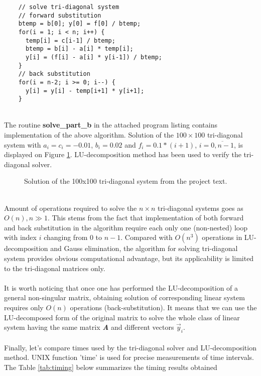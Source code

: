 \documentclass[]{article}
\begin{document}
  \begin{lstlisting}
    // solve tri-diagonal system
    // forward substitution
    btemp = b[0]; y[0] = f[0] / btemp;
    for(i = 1; i < n; i++) {
      temp[i] = c[i-1] / btemp;
      btemp = b[i] - a[i] * temp[i];
      y[i] = (f[i] - a[i] * y[i-1]) / btemp;
    }
    // back substitution
    for(i = n-2; i >= 0; i--) {
      y[i] = y[i] - temp[i+1] * y[i+1];
    }
  \end{lstlisting}
  \ \\
  The routine {\bf solve\_part\_b} in the attached program listing contains implementation of the above algorithm.
  Solution of the $100\times 100$ tri-diagonal system with $a_i = c_i = - 0.01$, $b_i = 0.02$ and $f_i = 0.1*(i+1)$,
  $i=\overline{0,n-1}$, is displayed on Figure \ref{fig:tridiag}. LU-decomposition method has been used to verify
  the tri-diagonal solver.\\
  \begin{figure}[htbp]
    \centering
    \caption{Solution of the 100x100 tri-diagonal system from the project text.}
    \label{fig:tridiag}
  \end{figure}
  \\
  Amount of operations required to solve the $n \times n$ tri-diagonal systems goes as $O(n), n \gg 1$. This stems
  from the fact that implementation of both forward and back substitution in the algorithm require each only
  one (non-nested) loop with index $i$ changing from 0 to $n-1$. Compared with $O(n^3)$ operations in LU-decomposition
  and Gauss elimination, the algorithm for solving tri-diagonal system provides obvious computational advantage,
  but its applicability is limited to the tri-diagonal matrices only.\\
  \\
  It is worth noticing that once one has performed the LU-decomposition of a general non-singular matrix, obtaining
  solution of corresponding linear system requires only $O(n)$ operations (back-substitution). It means that we
  can use the LU-decomposed form of the original matrix to solve the whole class of linear system having the same
  matrix {\bf \it A} and different vectors ${\vec y_i}$.\\
  \\
  Finally, let's compare times used by the tri-diagonal solver and LU-decomposition method. UNIX function 'time' is used
  for precise measurements of time intervals. The Table {\ref{tab:timing}} below summarizes the timing results obtained
\end{document}
